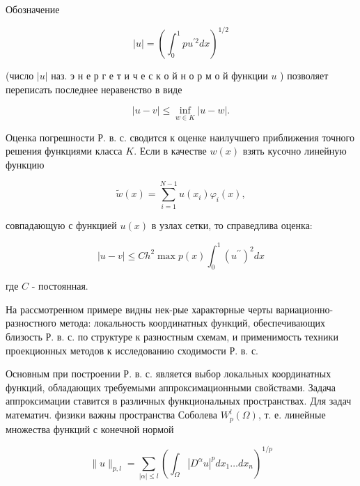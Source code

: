 \documentclass[10pt]{article}
\begin{document}
Обозначение



\[

|u|=\left(\int_{0}^{1} p u^{\prime 2} d x\right)^{1 / 2}

\]



(число $|u|$ наз. э н е р г е т и ч е с к о й н о р м о й функции $u$ ) позволяет переписать последнее неравенство в виде



\[

|u-v| \leq \inf _{w \in K}|u-w| .

\]



Оценка погрешности Р. в. с. сводится к оценке наилучшего приближения точного решения функциями класса $K$. Если в качестве $w(x)$ взять кусочно линейную функцию



\[

\tilde{w}(x)=\sum_{i=1}^{N-1} u\left(x_{i}\right) \varphi_{i}(x),

\]



совпадающую с функцией $u(x)$ в узлах сетки, то справедлива оценка:



\[

|u-v| \leqslant C h^{2} \max p(x) \int_{0}^{1}\left(u^{\prime \prime}\right)^{2} d x

\]



где $C$ - постоянная.



На рассмотренном примере видны нек-рые характөрные черты вариационно-разностного метода: локальность координатных функций, обеспечивающих близость Р. в. с. по структуре к разностным схемам, и применимость техники проекционных методов к исследованию сходимости Р. в. с.



Основным при построении Р. в. с. является выбор локальных координатных функций, обладающих требуемыми аппроксимационными свойствами. Задача аппроксимации ставится в различных функциональных пространствах. Для задач математич. физики важны пространства Соболева $W_{p}^{l}(\Omega)$, т. е. линейные множества функций с конечной нормой



\[

\|u\|_{p, l}=\sum_{|\alpha| \leqslant l}\left(\int_{\Omega}\left|D^{\alpha} u\right|^{p} d x_{1} \ldots d x_{n}\right)^{1 / p}

\]
\end{document}
